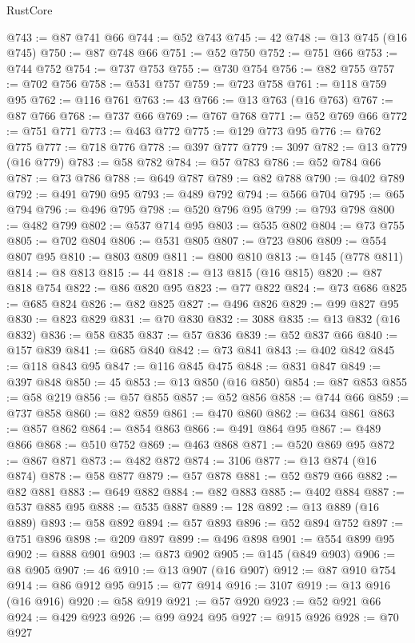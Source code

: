 \begin{lexlean}{RustCore}
\begin{coremodule}
@743 := @87 @741 @66
@744 := @52 @743
@745 := 42
@748 := @13 @745 (@16 @745)
@750 := @87 @748 @66
@751 := @52 @750
@752 := @751 @66
@753 := @744 @752
@754 := @737 @753
@755 := @730 @754
@756 := @82 @755
@757 := @702 @756
@758 := @531 @757
@759 := @723 @758
@761 := @118 @759 @95
@762 := @116 @761
@763 := 43
@766 := @13 @763 (@16 @763)
@767 := @87 @766
@768 := @737 @66
@769 := @767 @768
@771 := @52 @769 @66
@772 := @751 @771
@773 := @463 @772
@775 := @129 @773 @95
@776 := @762 @775
@777 := @718 @776
@778 := @397 @777
@779 := 3097
@782 := @13 @779 (@16 @779)
@783 := @58 @782
@784 := @57 @783
@786 := @52 @784 @66
@787 := @73 @786
@788 := @649 @787
@789 := @82 @788
@790 := @402 @789
@792 := @491 @790 @95
@793 := @489 @792
@794 := @566 @704
@795 := @65 @794
@796 := @496 @795
@798 := @520 @796 @95
@799 := @793 @798
@800 := @482 @799
@802 := @537 @714 @95
@803 := @535 @802
@804 := @73 @755
@805 := @702 @804
@806 := @531 @805
@807 := @723 @806
@809 := @554 @807 @95
@810 := @803 @809
@811 := @800 @810
@813 := @145 (@778 @811)
@814 := @8 @813
@815 := 44
@818 := @13 @815 (@16 @815)
@820 := @87 @818 @754
@822 := @86 @820 @95
@823 := @77 @822
@824 := @73 @686
@825 := @685 @824
@826 := @82 @825
@827 := @496 @826
@829 := @99 @827 @95
@830 := @823 @829
@831 := @70 @830
@832 := 3088
@835 := @13 @832 (@16 @832)
@836 := @58 @835
@837 := @57 @836
@839 := @52 @837 @66
@840 := @157 @839
@841 := @685 @840
@842 := @73 @841
@843 := @402 @842
@845 := @118 @843 @95
@847 := @116 @845 @475
@848 := @831 @847
@849 := @397 @848
@850 := 45
@853 := @13 @850 (@16 @850)
@854 := @87 @853
@855 := @58 @219
@856 := @57 @855
@857 := @52 @856
@858 := @744 @66
@859 := @737 @858
@860 := @82 @859
@861 := @470 @860
@862 := @634 @861
@863 := @857 @862
@864 := @854 @863
@866 := @491 @864 @95
@867 := @489 @866
@868 := @510 @752
@869 := @463 @868
@871 := @520 @869 @95
@872 := @867 @871
@873 := @482 @872
@874 := 3106
@877 := @13 @874 (@16 @874)
@878 := @58 @877
@879 := @57 @878
@881 := @52 @879 @66
@882 := @82 @881
@883 := @649 @882
@884 := @82 @883
@885 := @402 @884
@887 := @537 @885 @95
@888 := @535 @887
@889 := 128
@892 := @13 @889 (@16 @889)
@893 := @58 @892
@894 := @57 @893
@896 := @52 @894 @752
@897 := @751 @896
@898 := @209 @897
@899 := @496 @898
@901 := @554 @899 @95
@902 := @888 @901
@903 := @873 @902
@905 := @145 (@849 @903)
@906 := @8 @905
@907 := 46
@910 := @13 @907 (@16 @907)
@912 := @87 @910 @754
@914 := @86 @912 @95
@915 := @77 @914
@916 := 3107
@919 := @13 @916 (@16 @916)
@920 := @58 @919
@921 := @57 @920
@923 := @52 @921 @66
@924 := @429 @923
@926 := @99 @924 @95
@927 := @915 @926
@928 := @70 @927

\end{coremodule}
\end{lexlean}
